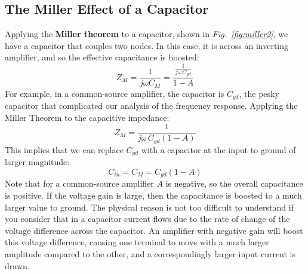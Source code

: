 \subsection{The Miller Effect of a Capacitor}
Applying the \textbf{Miller theorem} to a capacitor, shown in \emph{Fig.~\ref{fig:miller2}}, we have a capacitor that couples two nodes.  In this case, it is across an inverting amplifier, and so the effective capacitance is boosted:
    \begin{equation}
        Z_M = \frac{1}{j\omega C_M} = \frac{\frac{1}{j\omega\,C_{gd}}}{1 - A}
    \end{equation}
For example, in a common-source amplifier, the capacitor is $C_{gd}$, the pesky capacitor that complicated our analysis of the frequency response.  Applying the Miller Theorem to the capacitive impedance: 
    \begin{equation}
        Z_M = \frac{1}{j\omega\,C_{gd} (1 - A)}
    \end{equation}
This implies that we can replace $C_{gd}$ with a capacitor at the input to ground of larger magnitude:
    \begin{equation}
        C_{in} = C_M  = C_{gd} (1-A)
    \end{equation}
Note that for a common-source amplifier $A$ is negative, so the overall capacitance is positive.  If the voltage gain is large, then the capacitance is boosted to a much larger value to ground.  The physical reason is not too difficult to understand if you consider that in a capacitor current flows due to the rate of change of the voltage difference  across the capacitor.  An amplifier with negative gain will boost this voltage difference, causing one terminal to move with a much larger amplitude compared to the other, and a correspondingly larger input current is drawn. 
